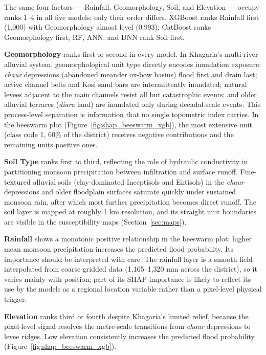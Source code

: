 \documentclass[12pt, a4paper]{article}
\begin{document}
The same four factors --- Rainfall, Geomorphology, Soil, and Elevation --- occupy ranks 1--4 in all five models; only their order differs. XGBoost ranks Rainfall first (1.000) with Geomorphology almost level (0.993); CatBoost ranks Geomorphology first; RF, ANN, and DNN rank Soil first.

\textbf{Geomorphology} ranks first or second in every model. In Khagaria's multi-river alluvial system, geomorphological unit type directly encodes inundation exposure: \textit{chaur} depressions (abandoned meander ox-bow basins) flood first and drain last; active channel belts and Kosi sand bars are intermittently inundated; natural levees adjacent to the main channels resist all but catastrophic events; and older alluvial terraces (\textit{diara} land) are inundated only during decadal-scale events. This process-level separation is information that no single topometric index carries. In the beeswarm plot (Figure~\ref{fig:shap_beeswarm_xgb}), the most extensive unit (class code 1, 60\% of the district) receives negative contributions and the remaining units positive ones.

\textbf{Soil Type} ranks first to third, reflecting the role of hydraulic conductivity in partitioning monsoon precipitation between infiltration and surface runoff. Fine-textured alluvial soils (clay-dominated Inceptisols and Entisols) in the \textit{chaur} depressions and older floodplain surfaces saturate quickly under sustained monsoon rain, after which most further precipitation becomes direct runoff. The soil layer is mapped at roughly 1 km resolution, and its straight unit boundaries are visible in the susceptibility maps (Section~\ref{sec:maps}).

\textbf{Rainfall} shows a monotonic positive relationship in the beeswarm plot: higher mean monsoon precipitation increases the predicted flood probability. Its importance should be interpreted with care. The rainfall layer is a smooth field interpolated from coarse gridded data (1,165--1,320 mm across the district), so it varies mainly with position; part of its SHAP importance is likely to reflect its use by the models as a regional location variable rather than a pixel-level physical trigger.

\textbf{Elevation} ranks third or fourth despite Khagaria's limited relief, because the pixel-level signal resolves the metre-scale transitions from \textit{chaur} depressions to levee ridges. Low elevation consistently increases the predicted flood probability (Figure~\ref{fig:shap_beeswarm_xgb}).
\end{document}
